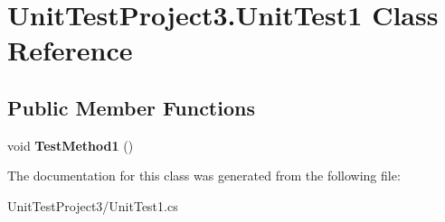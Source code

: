 \hypertarget{class_unit_test_project3_1_1_unit_test1}{}\section{Unit\+Test\+Project3.\+Unit\+Test1 Class Reference}
\label{class_unit_test_project3_1_1_unit_test1}
\subsection*{Public Member Functions}
\begin{DoxyCompactItemize}
\item 
\mbox{\label{class_unit_test_project3_1_1_unit_test1_afab843d5f1aa84cda987803be19cd7c0}} 
void {\bfseries Test\+Method1} ()
\end{DoxyCompactItemize}


The documentation for this class was generated from the following file\+:\begin{DoxyCompactItemize}
\item 
Unit\+Test\+Project3/Unit\+Test1.\+cs\end{DoxyCompactItemize}
